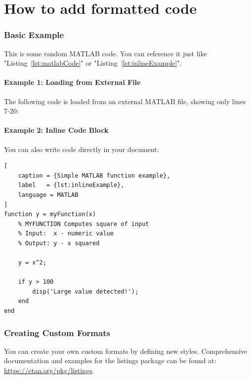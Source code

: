 \chapter{How to add formatted code}

\subsection{Basic Example}
This is some random MATLAB code. You can reference it just like "Listing~\ref{lst:matlabCode}" 
or "Listing~\ref{lst:inlineExample}".


\subsubsection*{Example 1: Loading from External File}
The following code is loaded from an external MATLAB file, showing only lines 7-20:



\subsubsection*{Example 2: Inline Code Block}
You can also write code directly in your document:
\begin{lstlisting}[
    caption = {Simple MATLAB function example},
    label   = {lst:inlineExample},
    language = MATLAB
]
function y = myFunction(x)
    % MYFUNCTION Computes square of input
    % Input:  x - numeric value
    % Output: y - x squared
    
    y = x^2;
    
    if y > 100
        disp('Large value detected!');
    end
end
\end{lstlisting}

\subsection{Creating Custom Formats}
            
You can create your own custom formats by defining new styles. Comprehensive documentation and examples for the listings package can be found at: \url{https://ctan.org/pkg/listings}.
